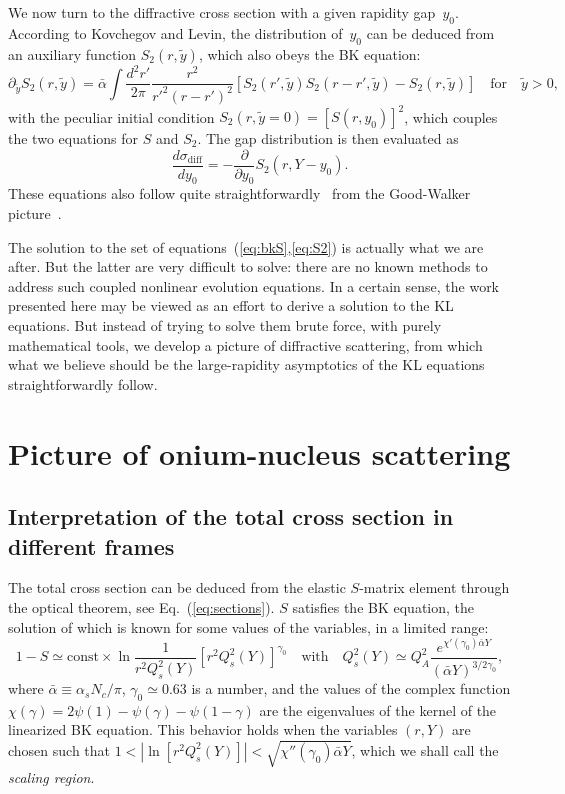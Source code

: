 \documentclass{webofc}
\def\be{\begin{equation}}
\def\ee{\end{equation}}
\begin{document}
We now turn to the diffractive cross section
with a given rapidity gap~$y_0$.
According to Kovchegov and Levin,
the distribution of~$y_0$ can be deduced from an auxiliary function $S_2(r,\tilde y)$,
which also obeys the BK equation:
\be
\partial_{\tilde y} S_2(r,\tilde y)=\bar\alpha\int\frac{d^2r'}{2\pi}\frac{r^2}{r'^2(r-r')^2}\left[
  S_2(r',\tilde y)S_2(r-r',\tilde y)-S_2(r,\tilde y)
  \right]\quad\text{for}\quad \tilde y>0,
\label{eq:S2}
\ee
{with the peculiar initial condition}
$S_2(r,\tilde y=0)=\left[S(r,y_0)\right]^2$, which couples the two equations for $S$ and $S_2$.
The gap distribution is then evaluated as
\be
\frac{d\sigma_\text{diff}}{dy_0}=-\frac{\partial}{\partial y_0}S_2(r,Y-y_0).
\ee
These equations also follow quite straightforwardly~\cite{Hatta:2006hs,Mueller:2018ned}
from the Good-Walker picture~\cite{Good:1960ba}.

The solution to the set of equations~(\ref{eq:bkS},\ref{eq:S2})
is actually
what we are after. But the latter are very difficult to solve: there are no known methods to address such
coupled nonlinear evolution equations.
In a certain sense, the work presented here may be viewed as an effort to derive a solution to the KL equations. But instead of trying to solve them brute force,
with purely mathematical tools, we develop a picture of diffractive scattering, from which what we believe should be the large-rapidity asymptotics of the KL equations straightforwardly follow.




\section{Picture of onium-nucleus scattering}



\subsection{Interpretation of the total cross section in different frames}

The total cross section can be deduced from the elastic $S$-matrix element through
the optical theorem, see Eq.~(\ref{eq:sections}). $S$ satisfies the BK equation, the solution of which
is known for some values of the variables, in a limited range:
\be
1-S\simeq \text{const}\times\ln\frac{1}{r^2Q_s^2(Y)}\left[r^2Q_s^2(Y)\right]^{\gamma_0}
\quad\text{with}\quad Q_s^2(Y)\simeq Q_A^2 \frac{e^{\chi'(\gamma_0)\bar\alpha Y}}{(\bar\alpha Y)^{3/2\gamma_0}},
\label{eq:oneminusS}
\ee
where $\bar\alpha\equiv\alpha_s N_c/\pi$, $\gamma_0\simeq 0.63$ is a number, and the values of the
complex function
$\chi(\gamma)=2\psi(1)-\psi(\gamma)-\psi(1-\gamma)$ are the eigenvalues of the kernel of the
linearized BK equation.
This behavior holds when the variables $(r,Y)$ are chosen such that
$1<|\ln [r^2Q_s^2(Y)]|<\sqrt{\chi''(\gamma_0)\bar\alpha Y}$, which we shall call the {\it scaling region}.
\end{document}
